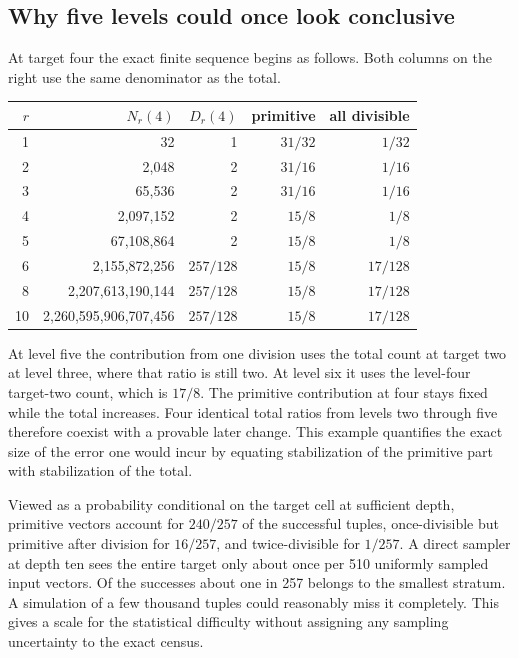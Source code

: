 \documentclass[12pt,letterpaper]{article}
\begin{document}
\subsection{Why five levels could once look conclusive}
At target four the exact finite sequence begins as follows. Both columns on the right use the same denominator as the total.
\begin{center}\small\begin{tabular}{rrrrr}\toprule
$r$ & $N_r(4)$ & $D_r(4)$ & primitive & all divisible\\\midrule
1&32&1&$31/32$&$1/32$\\
2&2,048&2&$31/16$&$1/16$\\
3&65,536&2&$31/16$&$1/16$\\
4&2,097,152&2&$15/8$&$1/8$\\
5&67,108,864&2&$15/8$&$1/8$\\
6&2,155,872,256&$257/128$&$15/8$&$17/128$\\
8&2,207,613,190,144&$257/128$&$15/8$&$17/128$\\
10&2,260,595,906,707,456&$257/128$&$15/8$&$17/128$\\\bottomrule
\end{tabular}\end{center}
At level five the contribution from one division uses the total count at target two at level three, where that ratio is still two. At level six it uses the level-four target-two count, which is $17/8$. The primitive contribution at four stays fixed while the total increases. Four identical total ratios from levels two through five therefore coexist with a provable later change. This example quantifies the exact size of the error one would incur by equating stabilization of the primitive part with stabilization of the total.
\par
Viewed as a probability conditional on the target cell at sufficient depth, primitive vectors account for $240/257$ of the successful tuples, once-divisible but primitive after division for $16/257$, and twice-divisible for $1/257$. A direct sampler at depth ten sees the entire target only about once per 510 uniformly sampled input vectors. Of the successes about one in 257 belongs to the smallest stratum. A simulation of a few thousand tuples could reasonably miss it completely. This gives a scale for the statistical difficulty without assigning any sampling uncertainty to the exact census.
\end{document}
